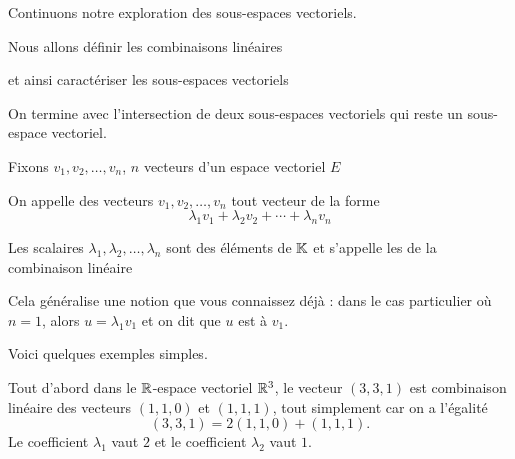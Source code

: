 







\debuttexte


\diapo

\change

Continuons notre exploration des sous-espaces vectoriels.

\change

Nous allons définir les combinaisons linéaires

\change 

et ainsi caractériser les sous-espaces vectoriels

\change

On termine avec l'intersection de deux sous-espaces vectoriels
qui reste un sous-espace vectoriel.

\diapo

Fixons  $v_1, v_2, \ldots, v_n$, $n$ vecteurs d'un espace vectoriel $E$

On appelle  des vecteurs $v_1, v_2, \ldots, v_n$
tout vecteur de la forme  
 $$\lambda_1 v_1+\lambda_2v_2+ \cdots + \lambda_nv_n$$
 
\change

Les scalaires $\lambda_1, \lambda_2, \ldots , \lambda_n$ sont des éléments de $\mathbb{K}$
    et s'appelle les  de la combinaison linéaire

\change

Cela généralise une notion que vous connaissez déjà : dans le cas particulier où
$n=1$, alors $u=\lambda_1 v_1$ et on dit que $u$ est  à $v_1$. 
 
 

\diapo

Voici quelques exemples simples.


Tout d'abord dans le $\mathbb{R}$-espace vectoriel $\mathbb{R}^3$, 
le vecteur $(3,3,1)$ est combinaison linéaire des vecteurs 
 $(1,1,0)$ et $(1,1,1)$, 
 tout simplement car on a l'égalité  
 $$(3,3,1)=2(1,1,0)+(1,1,1).$$
Le coefficient $\lambda_1$ vaut $2$ et le coefficient $\lambda_2$ vaut $1$.

\change

